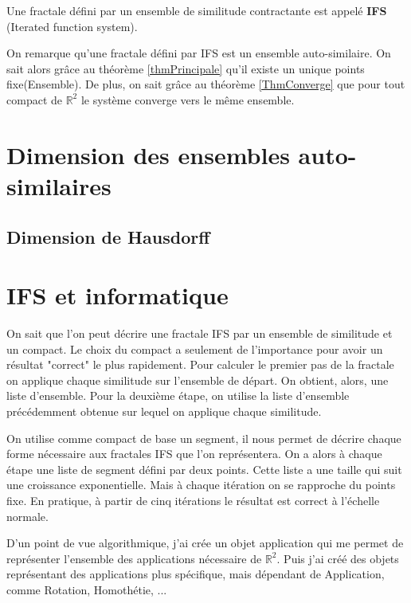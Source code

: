 \documentclass[a4paper, 12pt]{report}
\begin{document}
			\begin{definition}
				Une fractale défini par un ensemble de similitude contractante est appelé \textbf{IFS} (Iterated function system). 
			\end{definition}
			
			\hspace{.7 cm}On remarque qu'une fractale défini par IFS est un ensemble auto-similaire. On sait alors grâce au théorème \ref{thmPrincipale} qu'il existe un unique points fixe(Ensemble). De plus, on sait grâce au théorème \ref{ThmConverge} que pour tout compact de $\mathds{R}^2$ le système converge vers le même ensemble.

	\chapter{\bf Dimension des ensembles auto-similaires}
		\section{Dimension de Hausdorff}
	
	\chapter{IFS et informatique}
			
			On sait que l'on peut décrire une fractale IFS par un ensemble de similitude et un compact. Le choix du compact a seulement de l'importance pour avoir un résultat "correct" le plus rapidement. Pour calculer le premier pas de la fractale on applique chaque similitude sur l'ensemble de départ. On obtient, alors, une liste d'ensemble. Pour la deuxième étape, on utilise la liste d'ensemble précédemment obtenue sur lequel on applique chaque similitude.
			
			
			\vspace{.2 cm}\hspace{.7 cm}
			On utilise comme compact de base un segment, il nous permet de décrire chaque forme nécessaire aux fractales IFS que l'on représentera. On a alors à chaque étape une liste de segment défini par deux points. Cette liste a une taille qui suit une croissance exponentielle. Mais à chaque itération on se rapproche du points fixe. En pratique, à partir de cinq itérations le résultat est correct à l'échelle normale.
			
			\vspace{.2 cm}\hspace{.7 cm}
			D'un point de vue algorithmique, j'ai crée un objet application qui me permet de représenter l'ensemble des applications nécessaire de $\mathds{R}^2$. Puis j'ai créé des objets représentant des applications plus spécifique, mais dépendant de Application, comme Rotation, Homothétie, ...
			
\end{document}

